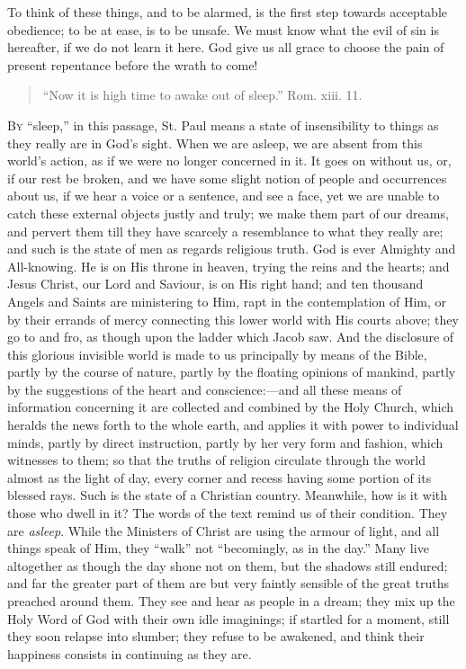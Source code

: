 To think of these things, and to be alarmed, is the first step towards acceptable obedience; to be at ease,
is to be unsafe. We must know what the evil of sin is
hereafter, if we do not learn it here. God give us all
grace to choose the pain of present repentance before the
wrath to come!


\begin{quote}

``Now it is high time to awake out of
sleep.'' Rom. xiii. 11.

\end{quote}

B\textsc{y} ``sleep,'' in this passage, St. Paul means
a state of insensibility to things as they really are in
God's sight. When we are asleep, we are absent from this
world's action, as if we were no longer concerned in it.
It goes on without us, or, if our rest be broken, and we
have some slight notion of people and occurrences about
us, if we hear a voice or a sentence, and see a face, yet
we are unable to catch these external objects justly and
truly; we make them part of our dreams, and pervert them
till they have scarcely a resemblance to what they really
are; and such is the state of men as regards religious
truth. God is ever Almighty and All-knowing. He is on His
throne in heaven, trying the reins and the hearts; and
Jesus Christ, our Lord and Saviour, is on His right hand;
and ten thousand Angels and Saints are ministering to
Him, rapt in the contemplation of Him, or by their
errands of mercy connecting this lower world with His
courts above; they go to and fro, as though upon the
ladder which Jacob saw. And the disclosure of this
glorious invisible world is made to us principally by
means of the Bible, partly by the course of nature,
partly by the floating opinions of mankind, partly by the
suggestions of the heart and conscience:—and all
these means of information concerning it are collected
and combined by the Holy Church, which heralds the news
forth to the whole earth, and applies it with power to
individual minds, partly by direct instruction, partly by
her very form and fashion, which witnesses to them; so
that the truths of religion circulate through the world
almost as the light of day, every corner and recess
having some portion of its blessed rays. Such is the
state of a Christian country. Meanwhile, how is it with
those who dwell in it? The words of the text remind us of
their condition. They are \emph{asleep}. While the
Ministers of Christ are using the armour of light, and
all things speak of Him, they ``walk'' not
``becomingly, as in the day.'' Many live
altogether as though the day shone not on them, but the
shadows still endured; and far the greater part of them
are but very faintly sensible of the great truths
preached around them. They see and hear as people in a
dream; they mix up the Holy Word of God with their own
idle imaginings; if startled for a moment, still they
soon relapse into slumber; they refuse to be awakened,
and think their happiness consists in continuing as they
are.

